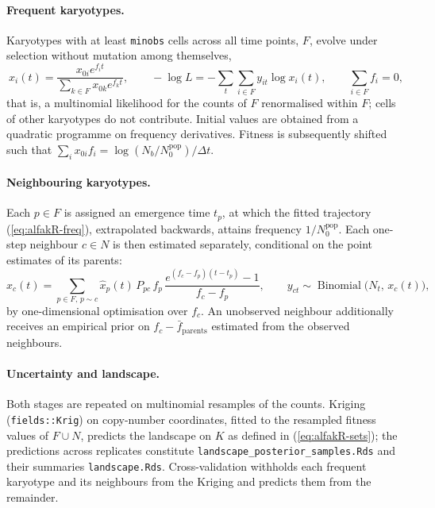 \documentclass[11pt]{article}
\begin{document}
\paragraph{Frequent karyotypes.}
Karyotypes with at least \texttt{minobs} cells across all time points, $F$, evolve
under selection without mutation among themselves,
\begin{equation}
  x_i(t)=\frac{x_{0i}e^{f_it}}{\sum_{k\in F}x_{0k}e^{f_kt}},\qquad
  -\log L=-\sum_t\sum_{i\in F}y_{it}\log x_i(t),\qquad \sum_{i\in F}f_i=0,
  \label{eq:alfakR-freq}
\end{equation}
that is, a multinomial likelihood for the counts of $F$ renormalised within
$F$; cells of other karyotypes do not contribute. Initial values are obtained
from a quadratic programme on frequency derivatives. Fitness is subsequently
shifted such that $\sum_ix_{0i}f_i=\log(N_b/N_0^{\mathrm{pop}})/\Delta t$.

\paragraph{Neighbouring karyotypes.}
Each $p\in F$ is assigned an emergence time $t_p$, at which the fitted
trajectory (\ref{eq:alfakR-freq}), extrapolated backwards, attains frequency
$1/N_0^{\mathrm{pop}}$. Each one-step neighbour $c\in N$ is then estimated
separately, conditional on the point estimates of its parents:
\begin{equation}
  x_c(t)=\sum_{p\in F,\,p\sim c}\hat x_p(t)\,P_{pc}\,f_p\,
  \frac{e^{(f_c-f_p)(t-t_p)}-1}{f_c-f_p},
  \qquad
  y_{ct}\sim\operatorname{Binomial}\bigl(N_t,\,x_c(t)\bigr),
  \label{eq:alfakR-nn}
\end{equation}
by one-dimensional optimisation over $f_c$. An unobserved neighbour
additionally receives an empirical prior on $f_c-\bar f_{\mathrm{parents}}$
estimated from the observed neighbours.

\paragraph{Uncertainty and landscape.}
Both stages are repeated on multinomial resamples of the counts. Kriging
(\texttt{fields::Krig}) on copy-number coordinates, fitted to the resampled
fitness values of $F\cup N$, predicts the landscape on $K$ as defined in
(\ref{eq:alfakR-sets}); the predictions across replicates constitute
\texttt{landscape\_posterior\_samples.Rds} and their summaries
\texttt{landscape.Rds}. Cross-validation withholds each frequent karyotype and
its neighbours from the Kriging and predicts them from the remainder.
\end{document}
